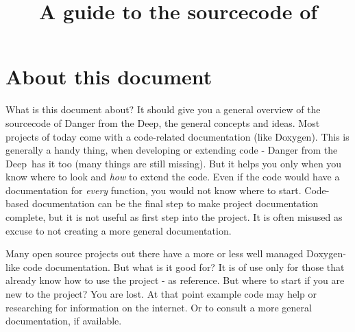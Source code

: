 \documentclass[english,a4paper,12pt]{report}
\title{A guide to the sourcecode of \dftd}
\newcommand{\dftd}{\textsf{Danger from the Deep}}
\begin{document}
\titlepage

\tableofcontents



\chapter{About this document}

What is this document about? It should give you a general overview of
the sourcecode of \dftd, the general concepts and ideas. Most projects
of today come with a code-related documentation (like Doxygen). This is
generally a handy thing, when developing or extending code - \dftd\ has
it too (many things are still missing). But it helps you only when you
know where to look and \emph{how} to extend the code.  Even if the code
would have a documentation for \emph{every} function, you would not know
where to start. Code-based documentation can be the final step to make
project documentation complete, but it is not useful as first step into
the project. It is often misused as excuse to not creating a more
general documentation.

Many open source projects out there have a more or less well managed
Doxygen-like code documentation. But what is it good for? It is of use
only for those that already know how to use the project - as reference.
But where to start if you are new to the project? You are lost. At that
point example code may help or researching for information on the
internet. Or to consult a more general documentation, if available.
\end{document}
